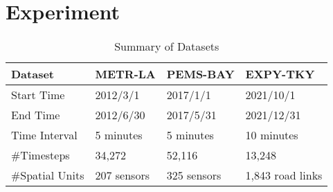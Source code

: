 \documentclass[letterpaper]{article} \usepackage{aaai23}  \usepackage{times}  \usepackage{helvet}  \usepackage{courier}  \usepackage[hyphens]{url}  \usepackage{graphicx} \urlstyle{rm} \def\UrlFont{\rm}  \usepackage{natbib}  \usepackage{caption} \usepackage{multirow}
\begin{document}
\section{Experiment}\label{sec:experiment}
\begin{table}[h]
  \footnotesize
  \centering
  \caption{Summary of Datasets}
  \label{tab:datasummary}
  \begin{tabular}{llll}
    \hline
	Dataset & METR-LA & PEMS-BAY & EXPY-TKY\\
    \hline
    Start Time & 2012/3/1 & 2017/1/1 & 2021/10/1\\
    End Time & 2012/6/30 & 2017/5/31 & 2021/12/31\\
    Time Interval & 5 minutes & 5 minutes & 10 minutes\\
    \#Timesteps & 34,272 & 52,116 & 13,248 \\
    \#Spatial Units & 207 sensors & 325 sensors & 1,843 road links\\
\hline
\end{tabular}
\end{table}
\end{document}
